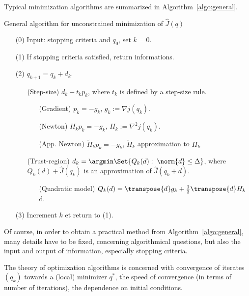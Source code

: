 Typical minimization algorithms are summarized in Algorithm~\ref{algo:general}.
 
\begin{tcolorbox}
\begin{algorithm}[H]
\caption{General algorithm for unconstrained minimization of $\hat J(q)$\label{algo:general}} 
\label{algorithm:generic0} 
%
\begin{enumerate}[align=left]
\item[(0)] Input: stopping criteria and $q_{0}$, set $k=0$.
\item[(1)] If stopping criteria satisfied, return informations.
\item[(2)] $\displaystyle q_{k+1} = q_{k} + d_{k}.$
%
\begin{enumerate}[align=left,labelwidth=2.5cm]
\item[(Step-size)] $d_{k}-t_k p_k$, where $t_k$ is defined by a step-size rule.
%
\begin{enumerate}[align=left,labelwidth=2.5cm]
\item[(Gradient)] $p_k = -g_k$, $g_k:= \nabla j(q_k)$.
\item[(Newton)] $H_kp_k = -g_k$, $H_k:= \nabla^2 j(q_k)$.
\item[(App. Newton)] $\tilde H_kp_k = -g_k$, $\tilde H_k$ approximation to $H_k$
\end{enumerate}
%
\item[(Trust-region)] $d_{k}=\argmin\Set{ Q_k(d):\; \norm{d}\le\Delta}$, where $Q_k(d) + \hat J(q_k)$ is an approximation of $\hat J(q_k+d)$.
%
\begin{enumerate}[align=left,labelwidth=2.5cm]
\item[(Quadratic model)] $Q_k(d) = \transpose{d}g_k + \frac12\transpose{d}H_k$ d.
\end{enumerate}
%
\end{enumerate}
\item[(3)] Increment $k$ et return to (1).
\end{enumerate}
%
\end{algorithm}
\end{tcolorbox}

Of course, in order to obtain a practical method from Algorithm~\ref{algo:general}, many details have to be fixed, concerning algorithmical questions, but also the input and output of information, especially stopping criteria. 

The theory of optimization algorithms is concerned with convergence of iterates $(q_k)$ towards a (local) minimizer 
$q^*$, the speed of convergence (in terms of number of iterations), the dependence on initial conditions.

